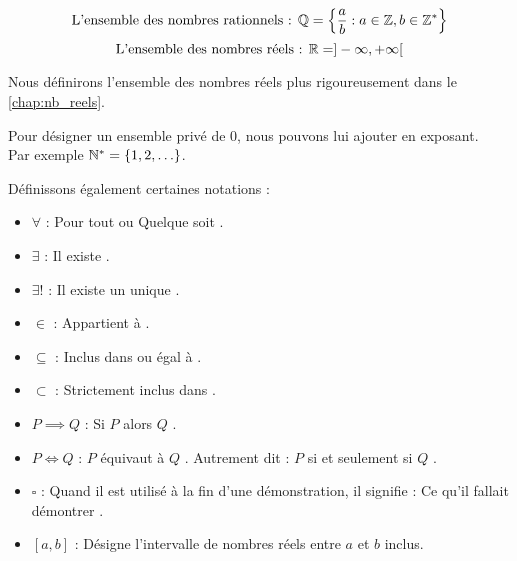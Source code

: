 \[ \text{L'ensemble des nombres rationnels : } \mathbb{Q} = \left\{ \frac{a}{b} : a \in \mathbb{Z}, b \in \mathbb{Z}^* \right\} \]
\[ \text{L'ensemble des nombres réels : } \mathbb{R} = ]-\infty, +\infty[ \]
\par \noindent Nous définirons l'ensemble des nombres réels plus rigoureusement dans le \autoref{chap:nb_reels}.
\\
\par \noindent Pour désigner un ensemble privé de 0, nous pouvons lui ajouter \og * \fg en exposant. 
\\ 
Par exemple $\mathbb{N}^* = \{1, 2, \ldots\}$.
\\
\par \noindent Définissons également certaines notations :
\begin{itemize}
    \item $\forall$ : \og Pour tout \fg ou \og Quelque soit \fg.
    \item $\exists$ : \og Il existe \fg.
    \item $\exists!$ : \og Il existe un unique \fg.
    \item $\in$ : \og Appartient à \fg.
    \item $\subseteq$ : \og Inclus dans  ou égal à \fg.
    \item $\subset$ : \og Strictement inclus dans \fg.
    \item $P \implies Q$ : \og Si $P$ alors $Q$ \fg.
    \item $P \iff Q$ : \og $P$ équivaut à $Q$ \fg. Autrement dit : \og $P$ si et seulement si $Q$ \fg.
    \item $\square$ : Quand il est utilisé à la fin d'une démonstration, il signifie : \og Ce qu'il fallait démontrer \fg.
    \item $[a, b]$ : Désigne l'intervalle de nombres réels entre $a$ et $b$ inclus.
\end{itemize}
